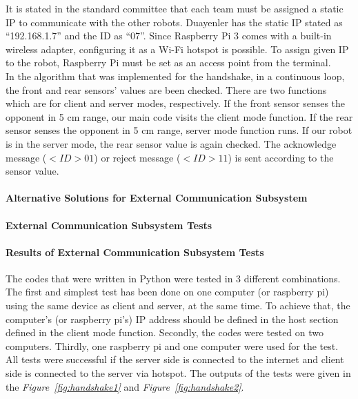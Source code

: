 \documentclass[a4paper,12pt]{article}
\begin{document}
	It is stated in the standard committee that each team must be assigned a static IP to communicate with the other robots. Duayenler has the static IP stated as “192.168.1.7” and the ID as “07”. Since Raspberry Pi 3 comes with a built-in wireless adapter, configuring it as a Wi-Fi hotspot is possible. To assign given IP to the robot, Raspberry Pi must be set as an access point from the terminal.\\
	
	In the algorithm that was implemented for the handshake, in a continuous loop, the front and rear sensors' values are been checked. There are two functions which are for client and server modes, respectively. If the front sensor senses the opponent in 5 cm range, our main code visits the client mode function. If the rear sensor senses the opponent in 5 cm range, server mode function runs. If our robot is in the server mode, the rear sensor value is again checked. The acknowledge message ($< ID> 01$) or reject message ($< ID> 11$) is sent according to the sensor value.
	
	\paragraph{Alternative Solutions for External Communication Subsystem}
	
	\paragraph{External Communication Subsystem Tests}
	
	\paragraph{Results of External Communication Subsystem Tests}
	
	The codes that were written in Python were tested in 3 different combinations. The first and simplest test has been done on one computer (or raspberry pi) using the same device as client and server, at the same time. To achieve that, the computer's (or raspberry pi’s) IP address should be defined in the host section defined in the client mode function. Secondly, the codes were tested on two computers. Thirdly, one raspberry pi and one computer were used for the test. All tests were successful if the server side is connected to the internet and client side is connected to the server via hotspot. The outputs of the tests were given in the \textit{Figure~\ref{fig:handshake1}} and \textit{Figure~\ref{fig:handshake2}}.
	
\end{document}
